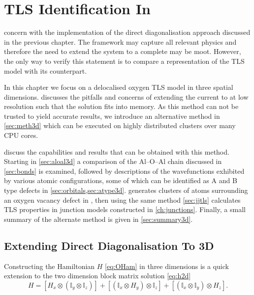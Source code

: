 \versoimage
\chapter{TLS Identification In }\label{ch:threedee}

 concern with the implementation of the direct diagonalisation approach discussed in the previous chapter.
The  framework may capture all relevant physics and therefore the need to extend the system to a complete  may be moot.
However, the only way to verify this statement is to compare a  representation of the TLS model with its  counterpart.

In this chapter we focus on a delocalised oxygen TLS model in three spatial dimensions.
 discusses the pitfalls and concerns of extending the current  to  at low resolution such that the solution fits into memory.
As this method can not be trusted to yield accurate results, we introduce an alternative method in \cref{sec:meth3d} which can be executed on highly distributed clusters over many CPU cores.

 discuss the capabilities and results that can be obtained with this method.
Starting in \cref{sec:aloal3d} a comparison of the Al--O--Al chain discussed in \cref{sec:bonds} is examined, followed by descriptions of the wavefunctions exhibited by various atomic configurations, some of which can be identified as A and B type defects in \cref{sec:orbitals,sec:atype3d}.
 generates clusters of atoms surrounding an oxygen vacancy defect in , then using the same method \cref{sec:jjtls} calculates TLS properties in junction models constructed in \cref{ch:junctions}.
Finally, a small summary of the alternate method is given in \cref{sec:summary3d}.

\section[Extending Direct Diagonalisation To \lin{3D}]{Extending Direct Diagonalisation To 3D}\label{sec:ddiagthree}

Constructing the Hamiltonian $H$ \cref{eq:OHam} in three dimensions is a quick extension to the two dimension block matrix solution \cref{eq:h2d}
\begin{equation}
H = \left[H_x \otimes (\mathbb{I}_y \otimes \mathbb{I}_z)\right] + \left[(\mathbb{I}_x \otimes H_y) \otimes \mathbb{I}_z\right] + \left[(\mathbb{I}_x \otimes \mathbb{I}_y) \otimes H_z\right].
\label{eq:h3d}
\end{equation}

